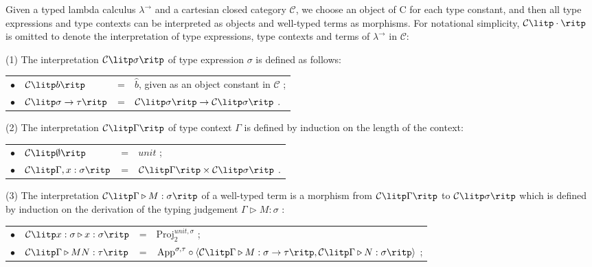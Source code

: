 \begin{definition}
\label{definition:inter_terms}
Given a typed lambda calculus $ \lambda ^ \to $ and a cartesian closed category $ \mathcal{C} $, we choose an object of C for each type constant, and then all type expressions and type contexts can be interpreted as objects and well-typed terms as morphisms. For notational simplicity, $ \mathcal{C} \litp \cdot \ritp $ is omitted to denote the interpretation of type expressions, type contexts and terms of $ \lambda ^ \to $ in $ \mathcal{C} $:
\begin{myitemize}
\item[(1)] The interpretation $ \mathcal{C} \litp \sigma \ritp $ of type expression $ \sigma $ is defined as follows: \\[5pt]
  \begin{tabular}{rlcl}
  $ \bullet $ & $ \mathcal{C} \litp b \ritp $ & = & $ \hat{b} $, given as an object constant in $ \mathcal{C} $ ; \\[5pt]
  $ \bullet $ & $ \mathcal{C} \litp \sigma \to \tau \ritp $ & = & $ \mathcal{C} \litp \sigma \ritp \to \mathcal{C} \litp \sigma \ritp $ . \\[5pt]
  \end{tabular}
\item[(2)] The interpretation $ \mathcal{C} \litp \Gamma \ritp $ of type context $ \Gamma $ is defined by induction on the length of the context: \\[5pt]
  \begin{tabular}{rlcl}
  $ \bullet $ & $ \mathcal{C} \litp \emptyset \ritp $ & = & $ unit $ ; \\[5pt]
  $ \bullet $ & $ \mathcal{C} \litp \Gamma , x: \sigma \ritp $ & = & $ \mathcal{C} \litp \Gamma \ritp \times \mathcal{C} \litp \sigma \ritp $ . \\[5pt]
  \end{tabular}
\item[(3)] The interpretation $ \mathcal{C} \litp \Gamma \triangleright M: \sigma \ritp $ of a well-typed term is a morphism from $ \mathcal{C} \litp \Gamma \ritp $ to $ \mathcal{C} \litp \sigma \ritp $ which is defined by induction on the derivation of the typing judgement $ \Gamma \triangleright M: \sigma $ : \\[5pt]
  \begin{tabular}{rlcl}
  $ \bullet $ & $ \mathcal{C} \litp x: \sigma \triangleright x: \sigma \ritp $ & = & $ \text{Proj}_2^{unit, \sigma} $ ; \\[5pt]
  $ \bullet $ & $ \mathcal{C} \litp \Gamma \triangleright MN: \tau \ritp $ & = & $ \text{App}^{\sigma,\tau} \circ \langle \mathcal{C} \litp \Gamma \triangleright M: \sigma \to \tau \ritp , \mathcal{C} \litp \Gamma \triangleright N: \sigma \ritp \rangle $ ; \\[5pt]

\end{tabular}
\end{myitemize}
\end{definition}
